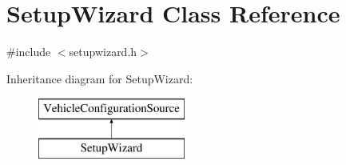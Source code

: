 \hypertarget{class_setup_wizard}{\section{\-Setup\-Wizard \-Class \-Reference}
\label{class_setup_wizard}
}


{\ttfamily \#include $<$setupwizard.\-h$>$}

\-Inheritance diagram for \-Setup\-Wizard\-:\begin{figure}[H]
\begin{center}
\leavevmode
\includegraphics[height=2.000000cm]{class_setup_wizard}
\end{center}
\end{figure}
